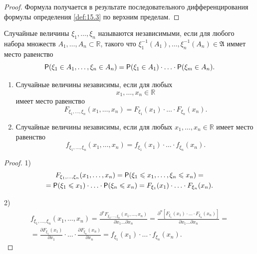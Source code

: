\begin{proof}
	Формула получается в результате последовательного дифференцирования формулы определения \ref{def:15.3} по верхним пределам.
\end{proof}

\begin{definition}
\label{def:15.5}
	Случайные величины $\xi_1, \dots, \xi_n$ называются независимыми, если для любого набора множеств $A_1,\dots ,A_n \subset \mathbb{R}$, такого что\newline
 	$\xi_1^{-1}(A_1), \dots, \xi_n^{-1}(A_n)\in\mathfrak{A}$ иммет место равенство
 	\begin{equation*}
 		\P(\xi_1\in A_1,\dots,\xi_n\in A_n)=\P(\xi_1 \in A_1)\cdot\ldots\cdot\P(\xi_m\in A_n).
 	\end{equation*}
\end{definition}

 \begin{lemma}\-
\label{lemma:15.6}

 \begin{enumerate}
 	\item Случайные величины независимы, если для любых $$x_1,\dots, x_n \in \mathbb{R}$$ имеет место равенство
 	\begin{equation*}
 		F_{\xi_1, \dots, \xi_n}(x_1,\dots,x_n)=F_{\xi_1}(x_1)\cdot\ldots\cdot F_{\xi_n}(x_n).
 	\end{equation*}
 	\item Случайные величины независимы, если для любых $x_1,\ldots,x_n\in\mathbb{R}$ имеет место равенство
 	\begin{equation*}
		f_{\xi_1, \dots, \xi_n}(x_1,\dots,x_n)=f_{\xi_1}(x_1)\cdot\ldots\cdot f_{\xi_n}(x_n). 		
 	\end{equation*}
 \end{enumerate}
\end{lemma}

\begin{proof}\-

	1)
	\begin{gather*}
	F_{\xi_1, \dots, \xi_n}(x_1,\dots,x_n)=\P(\xi_1\leqslant x_1,\ldots,\xi_n
	\leqslant x_n)=\\=
	\P(\xi_1\leqslant x_1)\cdot\ldots\cdot\P(\xi_n\leqslant x_n)=F_{\xi_1}(x_1)\cdot\ldots\cdot F_{\xi_n}(x_n).
	\end{gather*}	

	2)
	\begin{gather*}
	f_{\xi_1,\ldots,\xi_n}(x_1,\ldots,x_n)=
		\frac
		{\partial^nF_{\xi_1, \dots, \xi_n}(x_1,\dots,x_n)}
		{\partial x_1\ldots \partial x_n}=
		\frac
		{\partial^n\left[F_{\xi_1}(x_1)\cdot\ldots\cdot F_{\xi_n}(x_n)\right]}
		{\partial x_1\ldots \partial x_n}=\\=
		\frac{\partial F_{\xi_1}(x_1)}{\partial x_1}\cdot\ldots\cdot
		\frac{\partial F_{\xi_n}(x_n)}{\partial x_n}=f_{\xi_1}(x_1)\cdot\ldots\cdot f_{\xi_n}(x_n).
	\end{gather*}
\end{proof}


